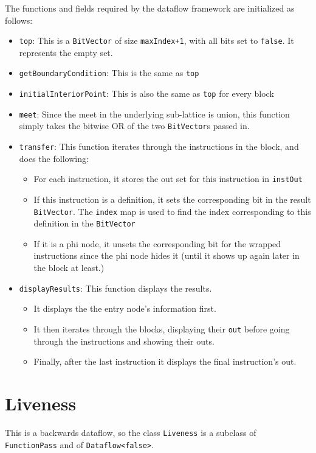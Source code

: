 \documentclass[12pt]{article}
\begin{document}
The functions and fields required by the dataflow framework are initialized as follows:
\begin{itemize}
\item \verb|top|: This is a \verb|BitVector| of size \verb|maxIndex+1|, with all bits set to \verb|false|. It represents the empty set.
\item \verb|getBoundaryCondition|: This is the same as \verb|top|
\item \verb|initialInteriorPoint|: This is also the same as \verb|top| for every block
\item \verb|meet|: Since the meet in the underlying sub-lattice is union, this function simply takes the bitwise OR of the two \verb|BitVector|s passed in.
\item \verb|transfer|: This function iterates through the instructions in the block, and does the following:
\begin{itemize}
  \item For each instruction, it stores the out set for this instruction in \verb|instOut|
  \item If this instruction is a definition, it sets the corresponding bit in the result \verb|BitVector|. The \verb|index| map is used to find the index corresponding to this definition in the \verb|BitVector|
  \item If it is a phi node, it unsets the corresponding bit for the wrapped instructions since the phi node hides it (until it shows up again later in the block at least.)
\end{itemize}
\item \verb|displayResults|: This function displays the results.
\begin{itemize}
	\item It displays the the entry node's information first.
	\item It then iterates through the blocks, displaying their \verb|out| before going through the instructions and showing their outs.
	\item Finally, after the last instruction it displays the final instruction's out.
\end{itemize}
\end{itemize}

\section{Liveness}
This is a backwards dataflow, so the class \verb|Liveness| is a subclass of \verb|FunctionPass| and of \verb|Dataflow<false>|.
\end{document}
